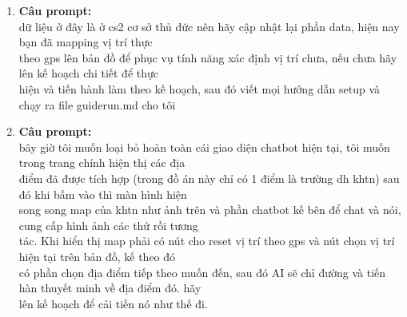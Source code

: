 \begin{enumerate}
\item \textbf{Câu prompt:} \\
\* dữ liệu ở đây là ở cs2 cơ sở thủ đức nên hãy cập nhật lại phần data, hiện nay bạn đã mapping vị trí thực \\
       theo gps lên bản đồ để phục vụ tính năng xác định vị trí chưa, nếu chưa hãy lên kế hoạch chi tiết để thực \\
       hiện và tiến hành làm theo kế hoạch, sau đó viết mọi hướng dẫn setup và chạy ra file guiderun.md cho tôi \\



\item \textbf{Câu prompt:} \\
\* bây giờ tôi muốn loại bỏ hoàn toàn cái giao diện chatbot hiện tại, tôi muốn trong trang chính hiện thị các địa \\
       điểm đã được tích hợp (trong đồ án này chỉ có 1 điểm là trường dh khtn) sau đó khi bấm vào thì màn hình hiện \\
       song song map của khtn như ảnh trên và phần chatbot kế bên để chat và nói, cung cấp hình ảnh các thứ rồi tương \\
       tác. Khi hiển thị map phải có nút cho reset vị trí theo gps và nút chọn vị trí hiện tại trên bản đồ, kế theo đó \\
       có phần chọn địa điểm tiếp theo muốn đến, sau đó AI sẽ chỉ đường và tiến hàn thuyết minh về địa điểm đó. hãy \\
       lên kế hoạch để cải tiến nó như thế đi. \\




\end{enumerate}
